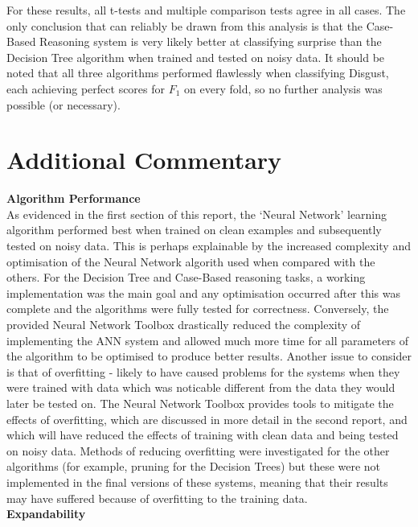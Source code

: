 \documentclass[a4paper]{article}
\begin{document}
 For these results, all t-tests and multiple comparison tests agree in all cases. The only conclusion that can reliably be drawn from
 this analysis is that the Case-Based Reasoning system is very likely better at classifying surprise than the Decision Tree algorithm
 when trained and tested on noisy data. It should be noted that all three algorithms performed flawlessly when classifying Disgust,
 each achieving perfect scores for $F_1$ on every fold, so no further analysis was possible (or necessary).\\
 
\section{Additional Commentary}

{\bf Algorithm Performance}\\

As evidenced in the first section of this report, the `Neural Network' learning algorithm performed best when trained on clean examples
and subsequently tested on noisy data. This is perhaps explainable by the increased complexity and optimisation of the Neural Network
algorith used when compared with the others. For the Decision Tree and Case-Based reasoning tasks, a working implementation was the main goal
and any optimisation occurred after this was complete and the algorithms were fully tested for correctness. Conversely, the provided Neural
Network Toolbox drastically reduced the complexity of implementing the ANN system and allowed much more time for all parameters of the algorithm
to be optimised to produce better results. Another issue to consider is that of overfitting - likely to have caused problems for the systems when
they were trained with data which was noticable different from the data they would later be tested on. The Neural Network Toolbox provides tools
to mitigate the effects of overfitting, which are discussed in more detail in the second report, and which will have reduced the effects of
training with clean data and being tested on noisy data. Methods of reducing overfitting were investigated for the other algorithms (for example,
pruning for the Decision Trees) but these were not implemented in the final versions of these systems, meaning that their results may have
suffered because of overfitting to the training data.\\

{\bf Expandability}\\
\end{document}
